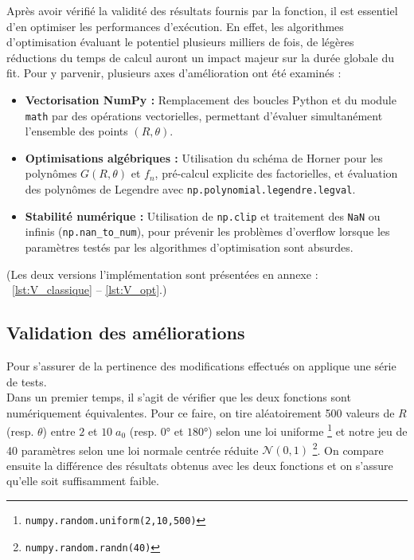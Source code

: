 \documentclass[11pt, a4paper, openany]{report}
\begin{document}
\noindent Après avoir vérifié la validité des résultats fournis par la fonction,
il est essentiel d'en optimiser les performances d'exécution. En effet, les algorithmes
d'optimisation évaluant le potentiel plusieurs milliers de fois, de légères réductions 
du temps de calcul auront un impact majeur sur la durée globale du fit. Pour y parvenir,
plusieurs axes d'amélioration ont été examinés :\\

\begin{itemize}
  \item \textbf{Vectorisation NumPy :} Remplacement des boucles Python et du module 
    \verb|math| par des opérations vectorielles, permettant d'évaluer 
    simultanément l'ensemble des points $(R, \theta)$.
  \item \textbf{Optimisations algébriques :} Utilisation du schéma de Horner
    pour les polynômes $G(R, \theta)$ et $f_n$, pré-calcul explicite des factorielles, 
    et évaluation des polynômes de Legendre avec \verb|np.polynomial.legendre.legval|.
  \item \textbf{Stabilité numérique :} Utilisation de \verb|np.clip| et traitement 
    des \verb|NaN| ou infinis (\verb|np.nan_to_num|), pour prévenir
    les problèmes d'overflow lorsque les paramètres testés par les algorithmes 
    d'optimisation sont absurdes.
\end{itemize}

\noindent (Les deux versions l'implémentation sont présentées en annexe : ~\ref{lst:V_classique} -- \ref{lst:V_opt}.)

\subsection{Validation des améliorations}

\noindent Pour s'assurer de la pertinence des modifications effectués on 
applique une série de tests.\\ 

\noindent Dans un premier temps, il s'agit de vérifier que les deux
fonctions sont numériquement équivalentes. Pour ce faire, on tire aléatoirement
500 valeurs de $R$ (resp. $\theta$) entre $2$ et $10\;a_0$ (resp. $0$° et $180$°) 
selon une loi uniforme \footnote{ \texttt{numpy.random.uniform(2,10,500)}} et 
notre jeu de 40 paramètres selon une loi normale centrée réduite 
$\mathcal{N}(0,1)$ \footnote{\texttt{numpy.random.randn(40)}}. On compare 
ensuite la différence des résultats obtenus avec les deux fonctions
et on s'assure qu'elle soit suffisamment faible.
\end{document}
